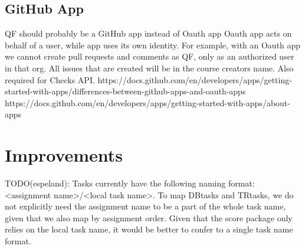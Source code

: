 \subsection{GitHub App}
\label{section:github-app}

QF should probably be a GitHub app instead of Oauth app
Oauth app acts on behalf of a user, while app uses its own identity.
For example, with an Oauth app we cannot create pull requests and comments as QF, only as an authorized user in that org.
All issues that are created will be in the course creators name.
Also required for Checks API.
https://docs.github.com/en/developers/apps/getting-started-with-apps/differences-between-github-apps-and-oauth-apps
https://docs.github.com/en/developers/apps/getting-started-with-apps/about-apps

\section{Improvements}

TODO(espeland): Tasks currently have the following naming format: <assignment name>/<local task name>.
To map DBtasks and TRtasks, we do not explicitly need the assignment name to be a part of the whole task name,
given that we also map by assignment order.
Given that the score package only relies on the local task name, it would be better to confer to a single task name format.